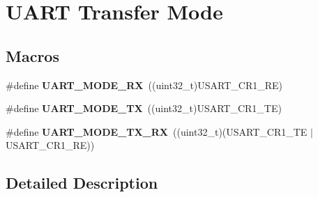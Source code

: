 \hypertarget{group___u_a_r_t___mode}{}\section{U\+A\+RT Transfer Mode}
\label{group___u_a_r_t___mode}
\subsection*{Macros}
\begin{DoxyCompactItemize}
\item 
\mbox{\label{group___u_a_r_t___mode_ga6cdc4e35cd90d15a964994499475e7d7}} 
\#define {\bfseries U\+A\+R\+T\+\_\+\+M\+O\+D\+E\+\_\+\+RX}~((uint32\+\_\+t)U\+S\+A\+R\+T\+\_\+\+C\+R1\+\_\+\+RE)
\item 
\mbox{\label{group___u_a_r_t___mode_gad54f095a1073bcd81787d13fc268bd62}} 
\#define {\bfseries U\+A\+R\+T\+\_\+\+M\+O\+D\+E\+\_\+\+TX}~((uint32\+\_\+t)U\+S\+A\+R\+T\+\_\+\+C\+R1\+\_\+\+TE)
\item 
\mbox{\label{group___u_a_r_t___mode_gab47c162935901e89322e2ce6700b6744}} 
\#define {\bfseries U\+A\+R\+T\+\_\+\+M\+O\+D\+E\+\_\+\+T\+X\+\_\+\+RX}~((uint32\+\_\+t)(U\+S\+A\+R\+T\+\_\+\+C\+R1\+\_\+\+TE $\vert$U\+S\+A\+R\+T\+\_\+\+C\+R1\+\_\+\+RE))
\end{DoxyCompactItemize}


\subsection{Detailed Description}
